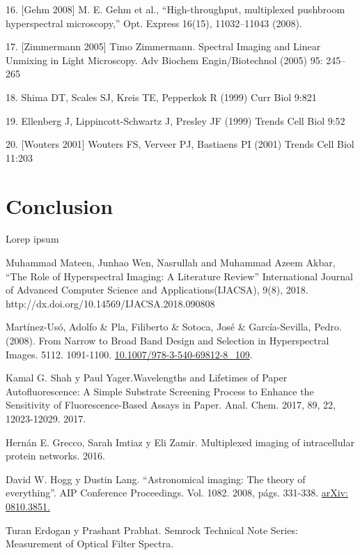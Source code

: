 \documentclass{ctuthesis}
\begin{document}
16. [Gehm 2008] M. E. Gehm et al., “High-throughput, multiplexed pushbroom hyperspectral microscopy,” Opt. Express 16(15), 11032–11043 (2008).

17. [Zimmermann 2005] Timo Zimmermann. Spectral Imaging and Linear Unmixing in Light Microscopy. Adv Biochem Engin/Biotechnol (2005) 95: 245– 265

18. Shima DT, Scales SJ, Kreis TE, Pepperkok R (1999) Curr Biol 9:821 

19. Ellenberg J, Lippincott-Schwartz J, Presley JF (1999) Trends Cell Biol 9:52

20. [Wouters 2001] Wouters FS, Verveer PJ, Bastiaens PI (2001) Trends Cell Biol 11:203
\chapter{Conclusion}

Lorep ipsum \cite{doe}


\renewcommand\bibname{Referencias Bibliográficas}
\begin{thebibliography}{1}

 Muhammad Mateen, Junhao Wen, Nasrullah and Muhammad Azeem 
Akbar, “The Role of Hyperspectral Imaging: A Literature Review” International 
Journal of Advanced Computer Science and Applications(IJACSA), 9(8), 2018. 
http://dx.doi.org/10.14569/IJACSA.2018.090808

 Martínez-Usó, Adolfo \& Pla, Filiberto \& Sotoca, José 
\& 
García-Sevilla, Pedro.(2008). From Narrow to Broad Band Design and Selection 
in Hyperspectral Images. 5112. 1091-1100. 
\href{https://www.researchgate.net/publication/221472272_From_Narrow_to_Broad_Band_Design_and_Selection_in_Hyperspectral_Images}{10.1007/978-3-540-69812-8\_109}.
 
 
 
 Kamal G. Shah y Paul Yager.Wavelengths and Lifetimes of 
Paper Autofluorescence: A Simple Substrate Screening Process to Enhance the 
Sensitivity of Fluorescence-Based Assays in Paper. Anal. Chem. 2017,  89, 22, 
12023-12029. 2017.
 
 Hernán E. Grecco, Sarah Imtiaz y Eli Zamir. Multiplexed
imaging of intracellular protein networks. 2016.

 David W. Hogg y Dustin Lang. “Astronomical imaging: The
	theory of everything”. AIP Conference Proceedings. Vol. 1082.
	2008, págs. 331-338. \href{https://arxiv.org/pdf/0810.3851.pdf}{arXiv: 
	0810.3851.}

 Turan Erdogan y Prashant Prabhat. Semrock Technical Note 
Series: Measurement of 
Optical Filter Spectra. 

\end{thebibliography}
\end{document}
